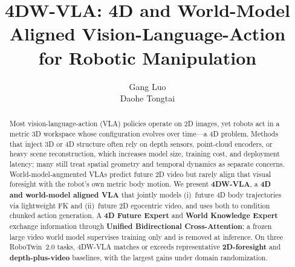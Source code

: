 \documentclass[conference]{IEEEtran}
\begin{document}
\title{4DW-VLA: 4D and World-Model Aligned Vision-Language-Action\\
       for Robotic Manipulation}

\author{Gang Luo\\Daohe Tongtai}

\maketitle

\begin{abstract}
Most vision-language-action (VLA) policies operate on 2D images, yet robots act in a metric 3D workspace whose configuration evolves over time---a 4D problem. Methods that inject 3D or 4D structure often rely on depth sensors, point-cloud encoders, or heavy scene reconstruction, which increases model size, training cost, and deployment latency; many still treat spatial geometry and temporal dynamics as separate concerns. World-model-augmented VLAs predict future 2D video but rarely align that visual foresight with the robot's own metric body motion. We present \textbf{4DW-VLA}, a \textbf{4D and world-model aligned VLA} that jointly models (i)~future 4D body trajectories via lightweight FK and (ii)~future 2D egocentric video, and uses both to condition chunked action generation. A \textbf{4D Future Expert} and \textbf{World Knowledge Expert} exchange information through \textbf{Unified Bidirectional Cross-Attention}; a frozen large video world model supervises training only and is removed at inference. On three RoboTwin~2.0 tasks, 4DW-VLA matches or exceeds representative \textbf{2D-foresight} and \textbf{depth-plus-video} baselines, with the largest gains under domain randomization.
\end{abstract}

\IEEEpeerreviewmaketitle





\end{document}

